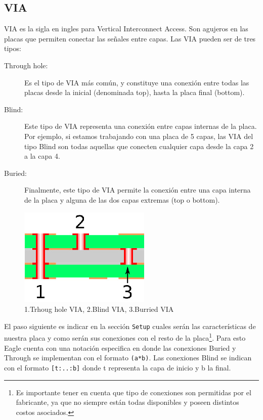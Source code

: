 \documentclass[11pt,letterpaper,spanish]{article}
\begin{document}
\subsection{VIA}
VIA es la sigla en ingles para Vertical Interconnect Access. Son agujeros en las placas que permiten conectar las señales entre capas. Las VIA pueden ser de tres tipos:
\begin{center}
\begin{description}
\item[Through hole:] Es el tipo de VIA más común, y constituye una conexión entre todas las placas desde la inicial (denominada  top), hasta la placa final (bottom).
\item[Blind:] Este tipo de VIA representa una conexión entre capas internas de la placa. Por ejemplo, si estamos trabajando con una placa de 5 capas, las  VIA del tipo Blind son todas aquellas que conecten cualquier capa desde la capa 2 a la capa 4.
\item[Buried:] Finalmente, este tipo de VIA permite la conexión entre una capa interna de la placa y alguna de las dos capas extremas (top o bottom).
\end{description}
\end{center}

\begin{figure}[!H]
\begin{center}
\includegraphics[scale=0.5]{figuras/1.JPG}
\end{center}
\caption{1.Trhoug hole VIA, 2.Blind VIA, 3.Burried VIA}
\end{figure}

El paso siguiente es indicar en la sección \verb+Setup+ cuales serán las características de nuestra placa y como serán sus conexiones con el resto de la placa\footnote{Es importante tener en cuenta que tipo de conexiones son permitidas por el fabricante, ya que no siempre están todas disponibles y poseen distintos costos asociados.}. Para esto Eagle cuenta con una notación especifica en donde las conexiones Buried y Through se implementan con el formato \verb+(a*b)+. Las conexiones Blind se indican con el formato \verb+[t:..:b]+ donde t representa la capa de inicio y b la final.
\end{document}
